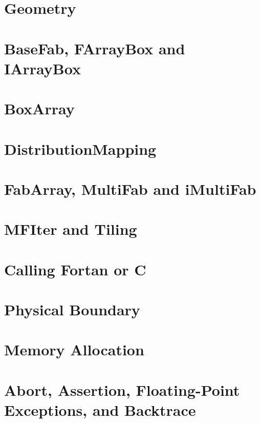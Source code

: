 \section{Geometry}


\section{BaseFab, FArrayBox and IArrayBox}

\section{BoxArray}

\section{DistributionMapping}

\section{FabArray, MultiFab and iMultiFab}
\label{sec:basics:multifab}


\section{MFIter and Tiling}

\section{Calling Fortan or C}

\section{Physical Boundary}

\section{Memory Allocation}

\section{Abort, Assertion, Floating-Point Exceptions, and Backtrace}
